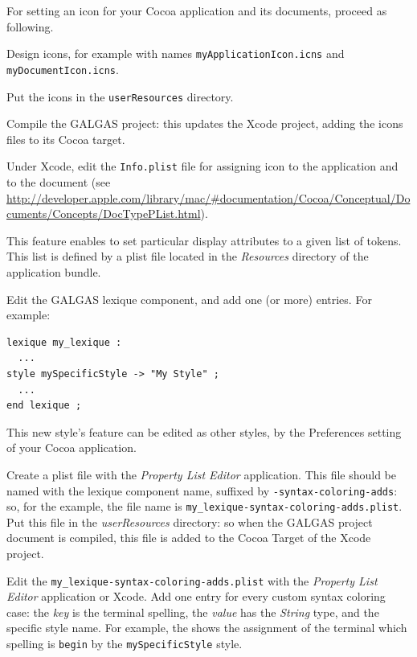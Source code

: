 For setting an icon for your Cocoa application and its documents, proceed as following.



 Design icons, for example with names \texttt{myApplicationIcon.icns} and \texttt{myDocumentIcon.icns}.

 Put the icons in the \texttt{userResources} directory.

 Compile the GALGAS project: this updates the Xcode project, adding the icons files to its Cocoa target.

 Under Xcode, edit the \texttt{Info.plist} file for assigning icon to the application and to the document (see \url{http://developer.apple.com/library/mac/#documentation/Cocoa/Conceptual/Documents/Concepts/DocTypePList.html}).




This feature enables to set particular display attributes to a given list of tokens. This list is defined by a plist file located in the \emph{Resources} directory of the application bundle.

 Edit the GALGAS lexique component, and add one (or more)  entries. For example:

\begin{lstlisting}[language=galgas]
lexique my_lexique :
  ...
style mySpecificStyle -> "My Style" ;
  ...
end lexique ;
\end{lstlisting}

This new style's feature can be edited as other styles, by the Preferences setting of your Cocoa application.


 Create a plist file with the \emph{Property List Editor} application. This file should be named with the lexique component name, suffixed by \texttt{-syntax-coloring-adds}: so, for the example, the file name is \texttt{my\_lexique-syntax-coloring-adds.plist}. Put this file in the \emph{userResources} directory: so when the GALGAS project document is compiled, this file is added to the Cocoa Target of the Xcode project. 

 Edit the \texttt{my\_lexique-syntax-coloring-adds.plist} with the  \emph{Property List Editor} application or Xcode. Add one entry for every custom syntax coloring case: the \emph{key} is the terminal spelling, the \emph{value} has the \emph{String} type, and the specific style name. For example, the  shows the assignment of the terminal which spelling is \texttt{begin} by the \texttt{mySpecificStyle} style.

